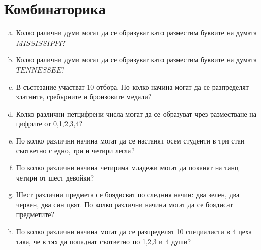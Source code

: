 \chapter{Комбинаторика}

\begin{problem}
  \begin{enumerate}[a)]
  \item
    Колко ралични думи могат да се образуват като разместим буквите на думата $MISSISSIPPI$?
  \item
    Колко ралични думи могат да се образуват като разместим буквите на думата $TENNESSEE$?
  \item
    В състезание участват 10 отбора. 
    По колко начина могат да се разпределят златните, сребърните и бронзовите медали?
  \item
    Колко различни петцифрени числа могат да се образуват чрез разместване на цифрите от 0,1,2,3,4?
  \item
    По колко различни начина могат да се настанят осем студенти в три стаи съответно с едно, три и четири легла?
  \item
    По колко различни начина четирима младежи могат да поканят на танц четири от шест девойки?
  \item
    Шест различни предмета се боядисват по следния начин: два зелен, два червен, два син цвят.
    По колко различни начина могат да се боядисат предметите?  
  \item
    По колко различни начина могат да се разпределят 10 специалисти в 4 цеха така, че в тях да попаднат съответно по 1,2,3 и 4 души?
  \end{enumerate}
\end{problem}



